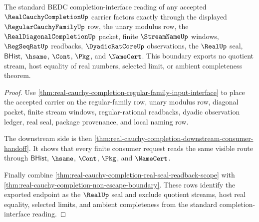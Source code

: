 \begin{theorem}
\label{thm:real-cauchy-completion-standard-bridge-boundary}
The standard BEDC completion-interface reading of any accepted $\RealCauchyCompletionUp$ carrier factors exactly through the displayed $\RegularCauchyFamilyUp$ row, the unary modulus row, the $\RealDiagonalCompletionUp$ packet, finite $\StreamNameUp$ windows, $\RegSeqRatUp$ readbacks, $\DyadicRatCoreUp$ observations, the $\RealUp$ seal, $\mathsf{BHist}$, $\hsame$, $\Cont$, $\Pkg$, and $\NameCert$. This boundary exports no quotient stream, host equality of real numbers, selected limit, or ambient completeness theorem.
\end{theorem}
\begin{proof}
Use \autoref{thm:real-cauchy-completion-regular-family-input-interface} to place the accepted carrier on the regular-family row, unary modulus row, diagonal packet, finite stream windows, regular-rational readbacks, dyadic observation ledger, real seal, package provenance, and local naming row.

The downstream side is then \autoref{thm:real-cauchy-completion-downstream-consumer-handoff}. It shows that every finite consumer request reads the same visible route through $\mathsf{BHist}$, $\hsame$, $\Cont$, $\Pkg$, and $\NameCert$.

Finally combine \autoref{thm:real-cauchy-completion-real-seal-readback-scope} with \autoref{thm:real-cauchy-completion-non-escape-boundary}. These rows identify the exported endpoint as the $\RealUp$ seal and exclude quotient streams, host real equality, selected limits, and ambient completeness from the standard completion-interface reading.
\end{proof}


